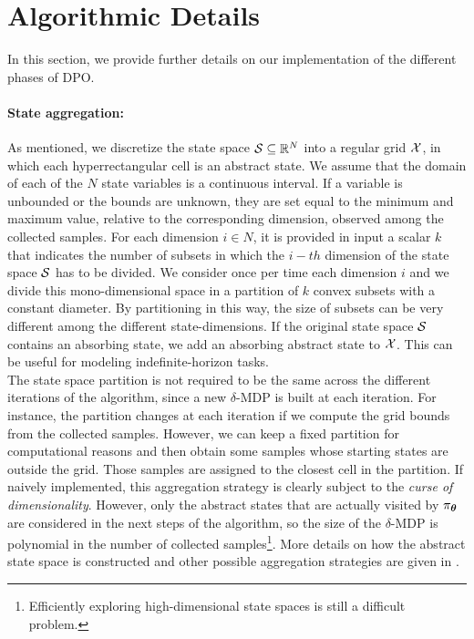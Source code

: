 \section{Algorithmic Details}\label{sec:detail}
In this section, we provide further details on our implementation of the different phases of \ac{DPO}.

\paragraph{State aggregation:}
As mentioned, we discretize the state space $\mathcal{S}\subseteq\mathbb{R}^N$ into a regular grid $\mathcal{X}$, in which each hyperrectangular cell is an abstract state. 
We assume that the domain of each of the $N$ state variables is a continuous interval. If a variable is unbounded or the bounds are unknown, they are set equal to the minimum and maximum value, relative to the corresponding dimension, observed among the collected samples. 
For each dimension $i \in N$, it is provided in input a scalar $k$ that indicates the number of subsets in which the $i-th$ dimension of the state space $\mathcal{S}$ has to be divided. We consider once per time each dimension $i$ and we divide this mono-dimensional space in a partition of $k$ convex subsets with a constant diameter. By partitioning in this way, the size of subsets can be very different among the different state-dimensions. 
If the original state space $\mathcal{S}$ contains an absorbing state, we add an absorbing abstract state to $\mathcal{X}$. This can be useful for modeling indefinite-horizon tasks.\\
\newline
The state space partition is not required to be the same across the different iterations of the algorithm, since a new $\delta$-MDP is built at each iteration. For instance, the partition changes at each iteration if we compute the grid bounds from the collected samples. However, we can keep a fixed partition for computational reasons and then obtain some samples whose starting states are outside the grid. Those samples are assigned to the closest cell in the partition.
If naively implemented, this aggregation strategy is clearly subject to the \textit{curse of dimensionality}. However, only the abstract states that are actually visited by $\pi_{\boldsymbol{\theta}}$ are considered in the next steps of the algorithm, so the size of the $\delta$-\ac{MDP} is polynomial in the number of collected samples\footnote{Efficiently exploring high-dimensional state spaces is still a difficult problem.}.  
More details on how the abstract state space is constructed and other possible aggregation strategies are given in .

